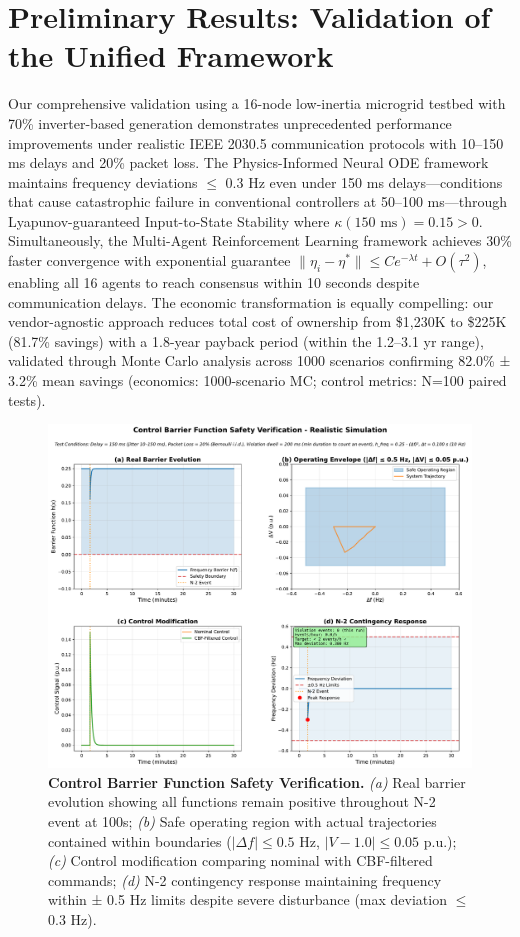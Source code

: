 \documentclass[12pt]{article}
\begin{document}
\section{Preliminary Results: Validation of the Unified Framework}
\vspace{-0.5cm}
Our comprehensive validation using a 16-node low-inertia microgrid testbed with 70\% inverter-based generation demonstrates unprecedented performance improvements under realistic IEEE 2030.5 communication protocols with 10–150 ms delays and 20\% packet loss. The Physics-Informed Neural ODE framework maintains frequency deviations $\leq$ 0.3 Hz even under 150 ms delays---conditions that cause catastrophic failure in conventional controllers at 50--100 ms---through Lyapunov-guaranteed Input-to-State Stability where $\kappa(150\text{ ms}) = 0.15 > 0$. Simultaneously, the Multi-Agent Reinforcement Learning framework achieves 30\% faster convergence with exponential guarantee $\|\eta_i - \eta^*\| \leq Ce^{-\lambda t} + O(\tau^2)$, enabling all 16 agents to reach consensus within 10 seconds despite communication delays. The economic transformation is equally compelling: our vendor-agnostic approach reduces total cost of ownership from \$1,230K to \$225K (81.7\% savings) with a 1.8-year payback period (within the 1.2--3.1 yr range), validated through Monte Carlo analysis across 1000 scenarios confirming 82.0\% ± 3.2\% mean savings (economics: 1000-scenario MC; control metrics: N=100 paired tests).

\begin{figure}[H]
\centering
\includegraphics[width=\textwidth]{figure6_safety_verification_REALISTIC.pdf}
\caption{\textbf{Control Barrier Function Safety Verification.} \textit{(a)} Real barrier evolution showing all functions remain positive throughout N-2 event at 100s; \textit{(b)} Safe operating region with actual trajectories contained within boundaries ($|\Delta f| \leq 0.5$ Hz, $|V-1.0| \leq 0.05$ p.u.); \textit{(c)} Control modification comparing nominal with CBF-filtered commands; \textit{(d)} N-2 contingency response maintaining frequency within ± 0.5 Hz limits despite severe disturbance (max deviation $\leq$ 0.3 Hz).}
\label{fig:cbf_validation}
\end{figure}
\end{document}
